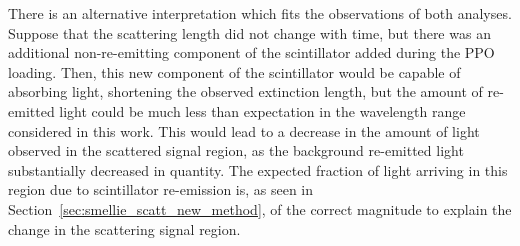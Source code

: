 There is an alternative interpretation which fits the observations of both analyses. Suppose that the scattering length did not change with time, but there was an additional non-re-emitting component of the scintillator added during the PPO loading. Then, this new component of the scintillator would be capable of absorbing light, shortening the observed extinction length, but the amount of re-emitted light could be much less than expectation in the wavelength range considered in this work. This would lead to a decrease in the amount of light observed in the scattered signal region, as the background re-emitted light substantially decreased in quantity. The expected fraction of light arriving in this region due to scintillator re-emission is, as seen in Section~\ref{sec:smellie_scatt_new_method}, of the correct magnitude to explain the change in the scattering signal region.


